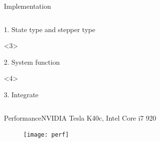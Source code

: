\documentclass[@BEAMER_OPTIONS@]{beamer}
\begin{document}
\begin{frame}[fragile]{Implementation}
\begin{columns}
\begin{column}[c]{0.62\textwidth}
\begin{onlyenv}
\begin{exampleblock}{1. State type and stepper type}
\begin{adjustbox}{width=0.75\textwidth, height=\textheight, keepaspectratio}
\begin{minipage}{\textwidth}
                        \end{minipage}
                    \end{adjustbox}
                \end{exampleblock}
            \end{onlyenv}
            \begin{onlyenv}<3>
                \begin{exampleblock}{2. System function}
                    \begin{adjustbox}{width=0.73\textwidth, height=\textheight, keepaspectratio}
                        \begin{minipage}{\textwidth}
                            
                        \end{minipage}
                    \end{adjustbox}
                \end{exampleblock}
            \end{onlyenv}
            \begin{onlyenv}<4>
                \begin{exampleblock}{3. Integrate}
                    \begin{adjustbox}{width=0.75\textwidth, height=\textheight, keepaspectratio}
                        \begin{minipage}{\textwidth}
                            
                        \end{minipage}
                    \end{adjustbox}
                \end{exampleblock}
            \end{onlyenv}
        \end{column}
    \end{columns}
\end{frame}

\begin{frame}[fragile]{Performance}{NVIDIA Tesla K40c, Intel Core i7 920
    \vspace{0.25\baselineskip}}
    \begin{figure}
        \texttt{[image: perf]}
    \end{figure}
\end{frame}
\end{document}
